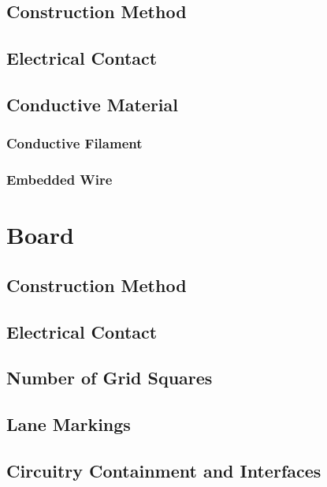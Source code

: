 \subsection{Construction Method}
\subsection{Electrical Contact}
\subsection{Conductive Material}
\subsubsection{Conductive Filament}
\subsubsection{Embedded Wire}

	
    
\section{Board}
\label{sec:board}

\subsection{Construction Method}
\subsection{Electrical Contact}
\subsection{Number of Grid Squares}
\subsection{Lane Markings}
\subsection{Circuitry Containment and Interfaces}

    
